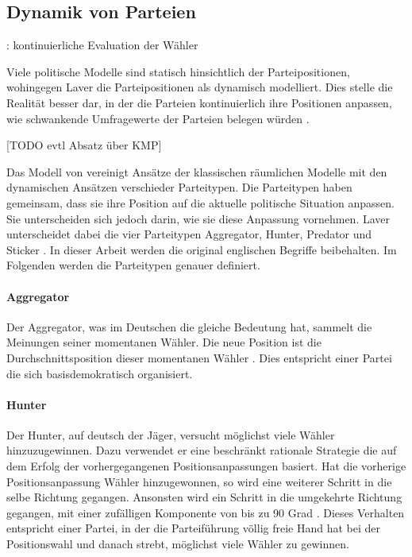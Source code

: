 \subsection{Dynamik von Parteien} \label{sec:ABM-Dynamik}

\citet{laver2005policy}: kontinuierliche Evaluation der Wähler

Viele politische Modelle sind statisch hinsichtlich der Parteipositionen, wohingegen Laver die Parteipositionen als dynamisch modelliert. Dies stelle die Realität besser dar, in der die Parteien kontinuierlich ihre Positionen anpassen, wie schwankende Umfragewerte der Parteien belegen würden \citep[S.\,263-4]{laver2005policy}.

[TODO evtl Absatz über KMP]

Das Modell von \citet{laver2005policy} vereinigt Ansätze der klassischen räumlichen Modelle mit den dynamischen Ansätzen verschieder Parteitypen. Die Parteitypen haben gemeinsam, dass sie ihre Position auf die aktuelle politische Situation anpassen. Sie unterscheiden sich jedoch darin, wie sie diese Anpassung vornehmen. Laver unterscheidet dabei die vier Parteitypen Aggregator, Hunter, Predator und Sticker \citep[S.\,266-7]{laver2005policy}. In dieser Arbeit werden die original englischen Begriffe beibehalten. Im Folgenden werden die Parteitypen genauer definiert.

\paragraph{Aggregator} Der Aggregator, was im Deutschen die gleiche Bedeutung hat, sammelt die Meinungen seiner momentanen Wähler. Die neue Position ist die Durchschnittsposition dieser momentanen Wähler \citep[S.\,267]{laver2005policy}. Dies entspricht einer Partei die sich basisdemokratisch organisiert.

\paragraph{Hunter} Der Hunter, auf deutsch der Jäger, versucht möglichst viele Wähler hinzuzugewinnen. Dazu verwendet er eine beschränkt rationale Strategie die auf dem Erfolg der vorhergegangenen Positionsanpassungen basiert. Hat die vorherige Positionsanpassung Wähler hinzugewonnen, so wird eine weiterer Schritt in die selbe Richtung gegangen. Ansonsten wird ein Schritt in die umgekehrte Richtung gegangen, mit einer zufälligen Komponente von bis zu 90 Grad \citep[S.\,267]{laver2005policy}. Dieses Verhalten entspricht einer Partei, in der die Parteiführung völlig freie Hand hat bei der Positionswahl und danach strebt, möglichst viele Wähler zu gewinnen.

